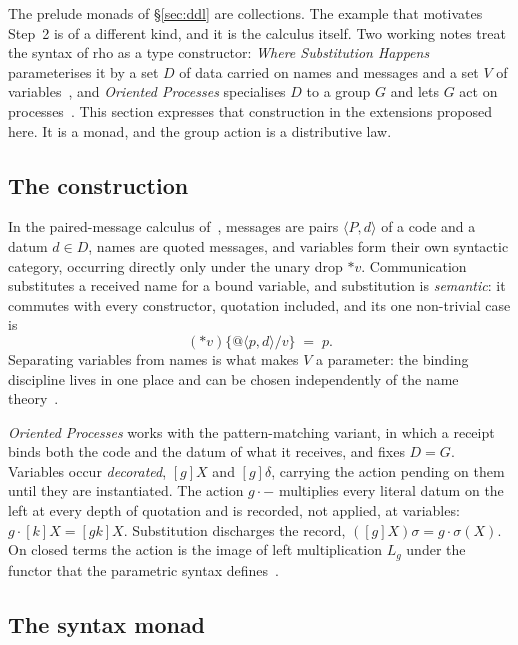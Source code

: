 \documentclass[11pt]{article}
\theoremstyle{definition}
\theoremstyle{plain}
\theoremstyle{remark}
\newcommand{\rhoc}{\textsf{rho}}
\begin{document}
The prelude monads of \S\ref{sec:ddl} are collections. The example that
motivates Step~2 is of a different kind, and it is the calculus itself. Two
working notes treat the syntax of \rhoc{} as a type constructor: \emph{Where
Substitution Happens} parameterises it by a set \(D\) of data carried on names
and messages and a set \(V\) of variables~\cite{WSH}, and \emph{Oriented
Processes} specialises \(D\) to a group \(G\) and lets \(G\) act on
processes~\cite{Oriented}. This section expresses that construction in the
extensions proposed here. It is a monad, and the group action is a
distributive law.

\subsection{The construction}

In the paired-message calculus of~\cite{WSH}, messages are pairs
\(\langle P, d\rangle\) of a code and a datum \(d\in D\), names are quoted
messages, and variables form their own syntactic category, occurring directly
only under the unary drop \(\ast v\). Communication substitutes a received name
for a bound variable, and substitution is \emph{semantic}: it commutes with
every constructor, quotation included, and its one non-trivial case is
\[
(\ast v)\{@\langle p, d\rangle / v\} \;=\; p .
\]
Separating variables from names is what makes \(V\) a parameter: the binding
discipline lives in one place and can be chosen independently of the name
theory~\cite{WSH}.

\emph{Oriented Processes} works with the pattern-matching variant, in which a
receipt binds both the code and the datum of what it receives, and fixes
\(D=G\). Variables occur \emph{decorated}, \([g]X\) and \([g]\delta\),
carrying the action pending on them until they are instantiated. The action
\(g\cdot-\) multiplies every literal datum on the left at every depth of
quotation and is recorded, not applied, at variables:
\(g\cdot[k]X=[gk]X\). Substitution discharges the record,
\(([g]X)\sigma = g\cdot\sigma(X)\). On closed terms the action is the image of
left multiplication \(L_g\) under the functor that the parametric syntax
defines~\cite{Oriented}.

\subsection{The syntax monad}
\end{document}

